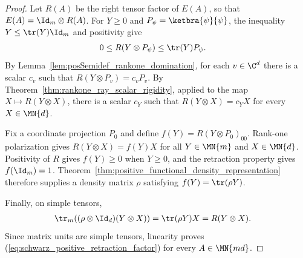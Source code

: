 \begin{proof}
    \leanok
    Let $R(A)$ be the right tensor factor of $E(A)$, so that
    $E(A)=\Id_m\otimes R(A)$. For $Y\geq0$ and
    $P_\psi=\ketbra{\psi}{\psi}$, the inequality
    $Y\leq\tr(Y)\Id_m$ and positivity give
    \begin{align}
        0
         & \leq R(Y\otimes P_\psi)
        \leq\tr(Y)P_\psi.
        \notag
    \end{align}
    By Lemma~\ref{lem:posSemidef_rankone_domination}, for each
    $v\in\C^d$ there is a scalar $c_v$ such that
    $R(Y\otimes P_v)=c_vP_v$.
    By Theorem~\ref{thm:rankone_ray_scalar_rigidity}, applied to the map
    $X\mapsto R(Y\otimes X)$, there is a scalar $c_Y$ such that
    $R(Y\otimes X)=c_YX$ for every $X\in\MN{d}$.

    Fix a coordinate projection $P_0$ and define
    $f(Y)=R(Y\otimes P_0)_{00}$. Rank-one polarization gives
    $R(Y\otimes X)=f(Y)X$ for all $Y\in\MN{m}$ and $X\in\MN{d}$.
    Positivity of $R$ gives $f(Y)\geq0$ when $Y\geq0$, and the retraction
    property gives $f(\Id_m)=1$.
    Theorem~\ref{thm:positive_functional_density_representation} therefore
    supplies a density matrix $\rho$ satisfying $f(Y)=\tr(\rho Y)$.

    Finally, on simple tensors,
    \begin{align}
        \tr_m\!\left((\rho\otimes\Id_d)(Y\otimes X)\right)
         & =\tr(\rho Y)X
        =R(Y\otimes X).
        \notag
    \end{align}
    Since matrix units are simple tensors, linearity proves
    (\ref{eq:schwarz_positive_retraction_factor}) for every
    $A\in\MN{md}$.
\end{proof}

